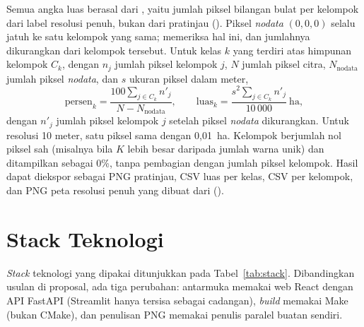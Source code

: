 Semua angka luas berasal dari , yaitu jumlah piksel bilangan bulat per kelompok dari label resolusi penuh, bukan dari pratinjau (). Piksel \emph{nodata} $(0,0,0)$ selalu jatuh ke satu kelompok yang sama;  memeriksa hal ini, dan jumlahnya dikurangkan dari kelompok tersebut. Untuk kelas $k$ yang terdiri atas himpunan kelompok $C_k$, dengan $n_j$ jumlah piksel kelompok $j$, $N$ jumlah piksel citra, $N_{\text{nodata}}$ jumlah piksel \emph{nodata}, dan $s$ ukuran piksel dalam meter,
\begin{equation}
    \text{persen}_k = \frac{100 \sum_{j \in C_k} n'_j}{N - N_{\text{nodata}}}, \qquad
    \text{luas}_k = \frac{s^2 \sum_{j \in C_k} n'_j}{10\,000}\ \text{ha},
    \label{eq:luas}
\end{equation}
dengan $n'_j$ jumlah piksel kelompok $j$ setelah piksel \emph{nodata} dikurangkan. Untuk resolusi 10 meter, satu piksel sama dengan 0,01~ha. Kelompok berjumlah nol piksel sah (misalnya bila $K$ lebih besar daripada jumlah warna unik) dan ditampilkan sebagai 0\%, tanpa pembagian dengan jumlah piksel kelompok. Hasil dapat diekspor sebagai PNG pratinjau, CSV luas per kelas, CSV per kelompok, dan PNG peta resolusi penuh yang dibuat dari  ().

\section{Stack Teknologi}
\label{sec:stack}
\emph{Stack} teknologi yang dipakai ditunjukkan pada Tabel~\ref{tab:stack}. Dibandingkan usulan di proposal, ada tiga perubahan: antarmuka memakai web React dengan API FastAPI (Streamlit hanya tersisa sebagai cadangan), \emph{build} memakai Make (bukan CMake), dan penulisan PNG memakai penulis paralel buatan sendiri.


